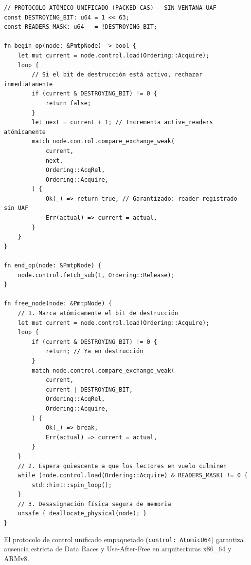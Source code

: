 \begin{lstlisting}[style=ruststyle, caption={Protocolo Quiescente con Palabra Atómica Unificada (Cierre Estricto UAF)}, label=lst:packed_cas_correct]
// PROTOCOLO ATÓMICO UNIFICADO (PACKED CAS) - SIN VENTANA UAF
const DESTROYING_BIT: u64 = 1 << 63;
const READERS_MASK: u64   = !DESTROYING_BIT;

fn begin_op(node: &PmtpNode) -> bool {
    let mut current = node.control.load(Ordering::Acquire);
    loop {
        // Si el bit de destrucción está activo, rechazar inmediatamente
        if (current & DESTROYING_BIT) != 0 {
            return false;
        }
        let next = current + 1; // Incrementa active_readers atómicamente
        match node.control.compare_exchange_weak(
            current,
            next,
            Ordering::AcqRel,
            Ordering::Acquire,
        ) {
            Ok(_) => return true, // Garantizado: reader registrado sin UAF
            Err(actual) => current = actual,
        }
    }
}

fn end_op(node: &PmtpNode) {
    node.control.fetch_sub(1, Ordering::Release);
}

fn free_node(node: &PmtpNode) {
    // 1. Marca atómicamente el bit de destrucción
    let mut current = node.control.load(Ordering::Acquire);
    loop {
        if (current & DESTROYING_BIT) != 0 {
            return; // Ya en destrucción
        }
        match node.control.compare_exchange_weak(
            current,
            current | DESTROYING_BIT,
            Ordering::AcqRel,
            Ordering::Acquire,
        ) {
            Ok(_) => break,
            Err(actual) => current = actual,
        }
    }
    // 2. Espera quiescente a que los lectores en vuelo culminen
    while (node.control.load(Ordering::Acquire) & READERS_MASK) != 0 {
        std::hint::spin_loop();
    }
    // 3. Desasignación física segura de memoria
    unsafe { deallocate_physical(node); }
}
\end{lstlisting}

\begin{theorem}
\label{thm:quiescence_packed}
El protocolo de control unificado empaquetado (\texttt{control: AtomicU64}) garantiza
ausencia estricta de Data Races y Use-After-Free en arquitecturas x86\_64 y ARMv8.
\end{theorem}

